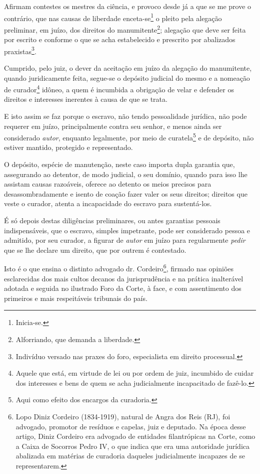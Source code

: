 \asterisc

Afirmam contestes os mestres da ciência, e provoco desde já a que se me
prove o contrário, que nas causas de liberdade enceta-se\footnote{
  Inicia-se.} o pleito pela alegação preliminar, em juízo, dos direitos
do manumitente\footnote{Alforriando, que demanda a liberdade.};
alegação que deve ser feita por escrito e conforme o que se acha
estabelecido e prescrito por abalizados praxistas\footnote{Indivíduo
  versado nas praxes do foro, especialista em direito processual.}.

Cumprido, pelo juiz, o dever da aceitação em juízo da alegação do
manumitente, quando juridicamente feita, segue-se o depósito judicial do
mesmo e a nomeação de curador\footnote{Aquele que está, em virtude de
  lei ou por ordem de juiz, incumbido de cuidar dos interesses e bens de
  quem se acha judicialmente incapacitado de fazê-lo.} idôneo, a quem é
incumbida a obrigação de velar e defender os direitos e interesses
inerentes à causa de que se trata.

E isto assim se faz porque o escravo, não tendo pessoalidade jurídica,
não pode requerer em juízo, principalmente contra seu senhor, e menos
ainda ser considerado \emph{autor}, enquanto legalmente, por meio de
curatela\footnote{Aqui como efeito dos encargos da curadoria.} e de
depósito, não estiver mantido, protegido e representado.

O depósito, espécie de manutenção, neste caso importa dupla garantia
que, assegurando ao detentor, de modo judicial, o seu domínio, quando
para isso lhe assistam causas razoáveis, oferece ao detento os meios
precisos para desassombradamente e isento de coação fazer valer os seus
direitos; direitos que veste o curador, atenta a incapacidade do escravo
para sustentá-los.

É só depois destas diligências preliminares, ou antes garantias pessoais
indispensáveis, que o escravo, simples impetrante, pode ser considerado
pessoa e admitido, por seu curador, a figurar de \emph{autor} em juízo
para regularmente \emph{pedir} que se lhe declare um direito, que por
outrem é contestado.

Isto é o que ensina o distinto advogado dr. Cordeiro\footnote{Lopo
  Diniz Cordeiro (1834-1919), natural de Angra dos Reis (RJ), foi
  advogado, promotor de resíduos e capelas, juiz e deputado. Na época
  desse artigo, Diniz Cordeiro era advogado de entidades filantrópicas
  na Corte, como a Caixa de Socorros Pedro IV, o que indica que era uma
  autoridade jurídica abalizada em matérias de curadoria daqueles
  judicialmente incapazes de se representarem.}, firmado nas opiniões
esclarecidas dos mais cultos decanos da jurisprudência e na prática
inalterável adotada e seguida no ilustrado Foro da Corte, à face, e com
assentimento dos primeiros e mais respeitáveis tribunais do país.

